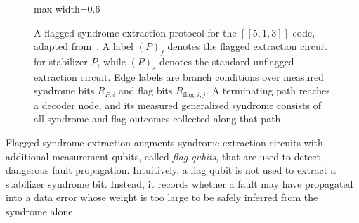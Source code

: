 \documentclass[acmsmall,screen,review,anonymous,nonacm]{acmart}
\begin{document}
\begin{figure}
\begin{adjustbox}{max width=0.6\textwidth}
    \end{adjustbox}
    \caption{A flagged syndrome-extraction protocol for the $[[5,1,3]]$ code, adapted from~\cite{CR18a}. A label $(P)_f$ denotes the flagged extraction circuit for stabilizer $P$, while $(P)_s$ denotes the standard unflagged extraction circuit. Edge labels are branch conditions over measured syndrome bits $R_{P,i}$ and flag bits $R_{\mathrm{flag},i,j}$. A terminating path reaches a decoder node, and its measured generalized syndrome consists of all syndrome and flag outcomes collected along that path.}
    \label{fig:five-qubit-flagged-protocol}
\end{figure}



Flagged syndrome extraction augments syndrome-extraction circuits with additional measurement qubits, called \emph{flag qubits}, that are used to detect dangerous fault propagation. Intuitively, a flag qubit is not used to extract a stabilizer syndrome bit. Instead, it records whether a fault may have propagated into a data error whose weight is too large to be safely inferred from the syndrome alone.
\end{document}
